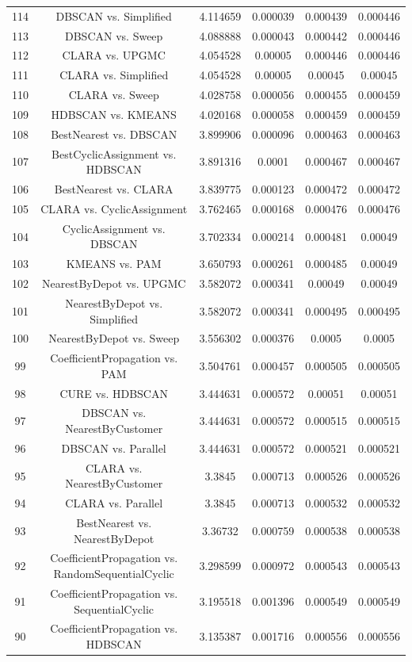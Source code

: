 \documentclass[a4paper,10pt]{article}
\begin{document}
\begin{landscape}
\begin{table}[!htp]
\begin{tabular}{cccccc}
114&DBSCAN vs. Simplified&4.114659&0.000039&0.000439&0.000446\\
113&DBSCAN vs. Sweep&4.088888&0.000043&0.000442&0.000446\\
112&CLARA vs. UPGMC&4.054528&0.00005&0.000446&0.000446\\
111&CLARA vs. Simplified&4.054528&0.00005&0.00045&0.00045\\
110&CLARA vs. Sweep&4.028758&0.000056&0.000455&0.000459\\
109&HDBSCAN vs. KMEANS&4.020168&0.000058&0.000459&0.000459\\
108&BestNearest vs. DBSCAN&3.899906&0.000096&0.000463&0.000463\\
107&BestCyclicAssignment vs. HDBSCAN&3.891316&0.0001&0.000467&0.000467\\
106&BestNearest vs. CLARA&3.839775&0.000123&0.000472&0.000472\\
105&CLARA vs. CyclicAssignment&3.762465&0.000168&0.000476&0.000476\\
104&CyclicAssignment vs. DBSCAN&3.702334&0.000214&0.000481&0.00049\\
103&KMEANS vs. PAM&3.650793&0.000261&0.000485&0.00049\\
102&NearestByDepot vs. UPGMC&3.582072&0.000341&0.00049&0.00049\\
101&NearestByDepot vs. Simplified&3.582072&0.000341&0.000495&0.000495\\
100&NearestByDepot vs. Sweep&3.556302&0.000376&0.0005&0.0005\\
99&CoefficientPropagation vs. PAM&3.504761&0.000457&0.000505&0.000505\\
98&CURE vs. HDBSCAN&3.444631&0.000572&0.00051&0.00051\\
97&DBSCAN vs. NearestByCustomer&3.444631&0.000572&0.000515&0.000515\\
96&DBSCAN vs. Parallel&3.444631&0.000572&0.000521&0.000521\\
95&CLARA vs. NearestByCustomer&3.3845&0.000713&0.000526&0.000526\\
94&CLARA vs. Parallel&3.3845&0.000713&0.000532&0.000532\\
93&BestNearest vs. NearestByDepot&3.36732&0.000759&0.000538&0.000538\\
92&CoefficientPropagation vs. RandomSequentialCyclic&3.298599&0.000972&0.000543&0.000543\\
91&CoefficientPropagation vs. SequentialCyclic&3.195518&0.001396&0.000549&0.000549\\
90&CoefficientPropagation vs. HDBSCAN&3.135387&0.001716&0.000556&0.000556\\

\end{tabular}
\end{table}
\end{landscape}
\end{document}
